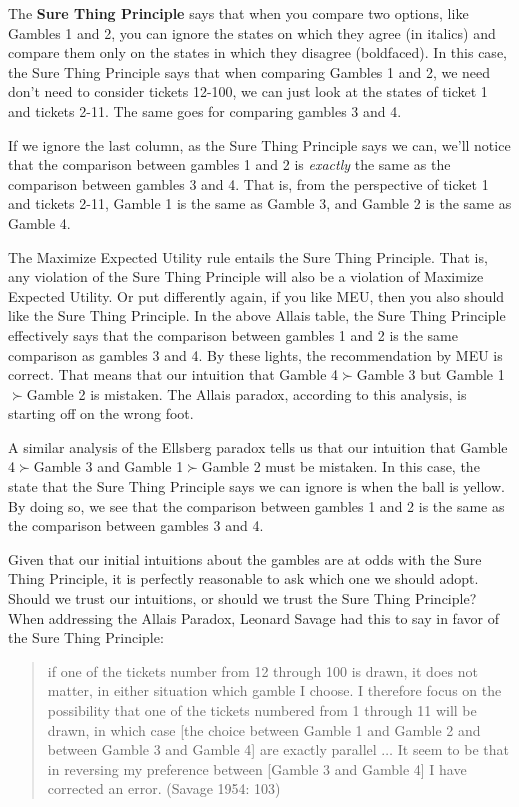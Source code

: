 \documentclass[]{tufte-book}
\begin{document}
The \textbf{Sure Thing Principle} says that when you compare two options, like Gambles 1 and 2, you can ignore the states on which they agree (in italics) and compare them only on the states in which they disagree (boldfaced). In this case, the Sure Thing Principle says that when comparing Gambles 1 and 2, we need don't need to consider tickets 12-100, we can just look at the states of ticket 1 and tickets 2-11. The same goes for comparing gambles 3 and 4.

If we ignore the last column, as the Sure Thing Principle says we can, we'll notice that the comparison between gambles 1 and 2 is \emph{exactly} the same as the comparison between gambles 3 and 4. That is, from the perspective of ticket 1 and tickets 2-11, Gamble 1 is the same as Gamble 3, and Gamble 2 is the same as Gamble 4.

The Maximize Expected Utility rule entails the Sure Thing Principle. That is, any violation of the Sure Thing Principle will also be a violation of Maximize Expected Utility. Or put differently again, if you like MEU, then you also should like the Sure Thing Principle. In the above Allais table, the Sure Thing Principle effectively says that the comparison between gambles 1 and 2 is the same comparison as gambles 3 and 4. By these lights, the recommendation by MEU is correct. That means that our intuition that Gamble 4\(\succ\)Gamble 3 but Gamble 1\(\succ\)Gamble 2 is mistaken. The Allais paradox, according to this analysis, is starting off on the wrong foot.

A similar analysis of the Ellsberg paradox tells us that our intuition that Gamble 4\(\succ\)Gamble 3 and Gamble 1\(\succ\)Gamble 2 must be mistaken. In this case, the state that the Sure Thing Principle says we can ignore is when the ball is yellow. By doing so, we see that the comparison between gambles 1 and 2 is the same as the comparison between gambles 3 and 4.

Given that our initial intuitions about the gambles are at odds with the Sure Thing Principle, it is perfectly reasonable to ask which one we should adopt. Should we trust our intuitions, or should we trust the Sure Thing Principle? When addressing the Allais Paradox, Leonard Savage had this to say in favor of the Sure Thing Principle:

\begin{quote}
if one of the tickets number from 12 through 100 is drawn, it does not matter, in either situation which gamble I choose. I therefore focus on the possibility that one of the tickets numbered from 1 through 11 will be drawn, in which case {[}the choice between Gamble 1 and Gamble 2 and between Gamble 3 and Gamble 4{]} are exactly parallel \(\ldots\) It seem to be that in reversing my preference between {[}Gamble 3 and Gamble 4{]} I have corrected an error. (Savage 1954: 103)
\end{quote}
\end{document}
